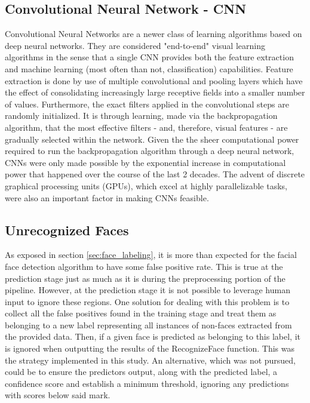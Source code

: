 \documentclass[11pt]{article}
\begin{document}
    \subsection{Convolutional Neural Network - CNN}\label{CNN}
        Convolutional Neural Networks are a newer class of learning algorithms based on deep neural networks. They are considered "end-to-end" visual learning algorithms in the sense that a single CNN provides both the feature extraction and machine learning (most often than not, classification) capabilities. Feature extraction is done by use of multiple convolutional and pooling layers which have the effect of consolidating increasingly large receptive fields into a smaller number of values. Furthermore, the exact filters applied in the convolutional steps are randomly initialized. It is through learning, made via the backpropagation algorithm, that the most effective filters - and, therefore, visual features - are gradually selected within the network. Given the the sheer computational power required to run the backpropagation algorithm through a deep neural network, CNNs were only made possible by the exponential increase in computational power that happened over the course of the last 2 decades. The advent of discrete graphical processing units (GPUs), which excel at highly parallelizable tasks, were also an important factor in making CNNs feasible.

    \subsection{Unrecognized Faces}\label{sec:non-faces}
        As exposed in section \ref{sec:face_labeling}, it is more than expected for the facial face detection algorithm to have some false positive rate. This is true at the prediction stage just as much as it is during the preprocessing portion of the pipeline. However, at the prediction stage it is not possible to leverage human input to ignore these regions. One solution for dealing with this problem is to collect all the false positives found in the training stage and treat them as belonging to a new label representing all instances of non-faces extracted from the provided data. Then, if a given face is predicted as belonging to this label, it is ignored when outputting the results of the RecognizeFace function. This was the strategy implemented in this study. An alternative, which was not pursued, could be to ensure the predictors output, along with the predicted label, a confidence score and establish a minimum threshold, ignoring any predictions with scores below said mark.
\end{document}
